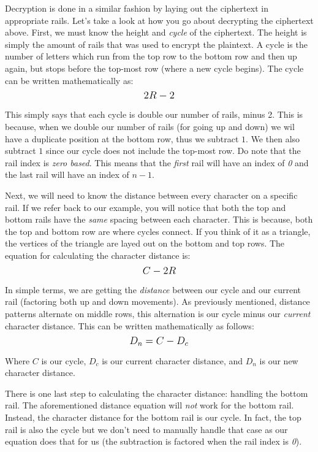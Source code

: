 Decryption is done in a similar fashion by laying out the ciphertext in appropriate rails. Let's take a look at how
you go about decrypting the ciphertext above. First, we must know the height and \textit{cycle} of the ciphertext. The height
is simply the amount of rails that was used to encrypt the plaintext. A cycle is the number of letters which run from the top 
row to the bottom row and then up again, but stops before the top-most row (where a new cycle begins). The cycle can be 
written mathematically as: $$\mathlarger{2R - 2}$$ 

This simply says that each cycle is double our number of rails, minus 2. This is because, when we double our number of rails
(for going up and down) we wil have a duplicate position at the bottom row, thus we subtract $1$. We then also 
subtract $1$ since our cycle does not include the top-most row. Do note that the rail index is \textit{zero based}. This means
that the \textit{first} rail will have an index of \textit{0} and the last rail will have an index of $n - 1$.

Next, we will need to know the distance between every character on a specific rail. If we refer back to our example,
you will notice that both the top and bottom rails have the \textit{same} spacing between each character. This is because,
both the top and bottom row are where cycles connect. If you think of it as a triangle, the vertices of the triangle are
layed out on the bottom and top rows. The equation for calculating the character distance is: $$\mathlarger{C - 2R}$$

In simple terms, we are getting the \textit{distance} between our cycle and our current rail (factoring both up and
 down movements). As previously mentioned, distance patterns alternate on middle rows, this alternation is our cycle
  minus our \textit{current} character distance. This can be written mathematically as follows: $$\mathlarger{D_n = C - D_c}$$

Where $C$ is our cycle, $D_c$ is our current character distance, and $D_n$ is our new character distance.

There is one last step to calculating the character distance: handling the bottom rail. The aforementioned distance equation
will \textit{not} work for the bottom rail. Instead, the character distance for the bottom rail is our cycle. 
In fact, the top rail is also the cycle but we don't need to manually handle that case as our equation does that for us 
(the subtraction is factored when the rail index is \textit{0}).

